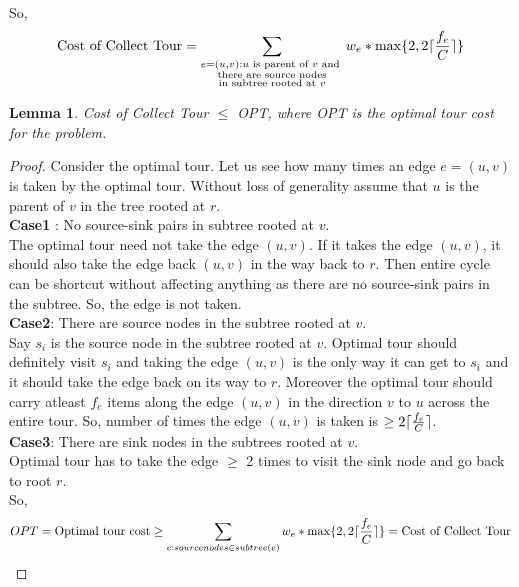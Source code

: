 \documentclass{article}
\DeclarePairedDelimiter{\ceil}{\lceil}{\rceil}
\newtheorem{lemma}[theorem]{Lemma}
\begin{document}
So,
\begin{equation}
    \text{Cost of Collect Tour} = \sum_{\substack{e = (u,v) : u\text{ is parent of }v\text{ and }\\\text{there are source nodes}\\\text{in subtree rooted at }v}} w_e*\max\{2, 2\ceil{\frac{f_e}{C}}\}
\end{equation}
\begin{lemma}
Cost of Collect Tour $\leq$ OPT, where OPT is the optimal tour cost for the problem.
\end{lemma}
\begin{proof}
Consider the optimal tour. Let us see how many times an edge $e = (u,v)$ is taken by the optimal tour. Without loss of generality assume that $u$ is the parent of $v$ in the tree rooted at $r$.\\
\textbf{Case1} : No source-sink pairs in subtree rooted at $v$.\\
The optimal tour need not take the edge $(u,v)$. If it takes the edge $(u,v)$, it should also take the edge back $(u,v)$ in the way back to $r$. Then entire cycle can be shortcut without affecting anything as there are no source-sink pairs in the subtree. So, the edge is not taken.\\
\textbf{Case2}: There are source nodes in the subtree rooted at $v$.\\
Say $s_i$ is the source node in the subtree rooted at $v$. Optimal tour should definitely visit $s_i$ and taking the edge $(u,v)$ is the only way it can get to $s_i$ and it should take the edge back on its way to $r$. Moreover the optimal tour should carry atleast $f_e$ items along the edge $(u,v)$ in the direction $v$ to $u$ across the entire tour. So, number of times the edge $(u,v)$ is taken is $\geq 2\ceil{\frac{f_e}{C}}$.\\
\textbf{Case3}: There are sink nodes in the subtrees rooted at $v$.\\
Optimal tour has to take the edge $\geq$ 2 times to visit the sink node and go back to root $r$.\\

So,
\begin{equation}
    OPT = \text{Optimal tour cost} \geq \sum_{e : sourcenodes \in subtree(e)}w_e*\max\{2,2\ceil{\frac{f_e}{C}}\} = \text{Cost of Collect Tour}
\end{equation}
\end{proof}
\end{document}

